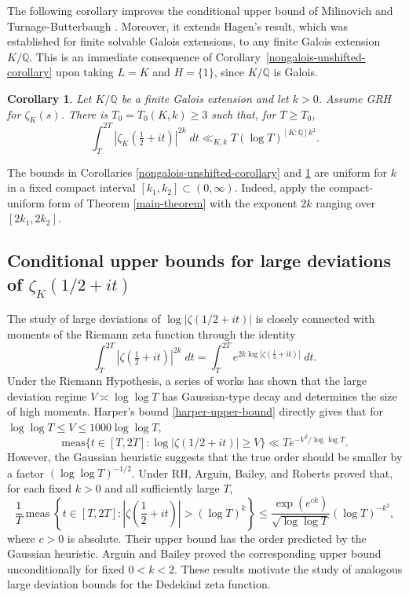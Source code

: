 \documentclass[twoside,reqno,11pt,a4paper]{amsart}
\numberwithin{equation}{section}
\theoremstyle{plain}
\newtheorem{cor}[thm]{Corollary}
\theoremstyle{definition}
\theoremstyle{remark}
\renewcommand{\le}{\leqslant}
\renewcommand{\leq}{\leqslant}
\renewcommand{\ge}{\geqslant}
\renewcommand{\geq}{\geqslant}
\begin{document}
The following corollary improves the conditional upper bound of Milinovich and Turnage-Butterbaugh \cite{M-T}. Moreover, it extends Hagen's \cite{Hagen} result, which was established for finite solvable Galois extensions, to any finite Galois extension $K/\mathbb{Q}$. This is an immediate consequence of Corollary~\ref{nongalois-unshifted-corollary} upon taking $L=K$ and $H=\{1\}$, since $K/\mathbb{Q}$ is Galois.

		\begin{cor}\label{sharp-bound-dedekind-zeta}
Let $K/\mathbb Q$ be a finite Galois extension and let $k>0$. Assume GRH for $\zeta_K(s)$. There is $T_0=T_0(K,k)\ge3$ such that, for $T\ge T_0$,
			\begin{equation*}
				\int_{T}^{2T}\left|\zeta_K\left(\tfrac{1}{2}+it\right) \right|^{2k}\;dt\ll_{K,k} T(\log T)^{[K:\mathbb{Q}]k^2}.
			\end{equation*}
		\end{cor}

The bounds in Corollaries \ref{nongalois-unshifted-corollary} and \ref{sharp-bound-dedekind-zeta} are uniform for $k$ in a fixed compact interval $[k_1,k_2]\subset(0,\infty)$. Indeed, apply the compact-uniform form of Theorem \ref{main-theorem} with the exponent $2k$ ranging over $[2k_1,2k_2]$.

\subsection{Conditional upper bounds for large deviations of $\zeta_K(1/2+it)$}
The study of large deviations of $\log |\zeta(1/2+it)|$ is closely connected with moments of the Riemann zeta function through the identity
\begin{equation*}
\int_T^{2T}|\zeta(\tfrac{1}{2}+it)|^{2k}\;dt=\int_T^{2T}e^{2k\log|\zeta(\tfrac{1}{2}+it)|}\;dt.
\end{equation*}
Under the Riemann Hypothesis, a series of works has shown that the large deviation regime $V\asymp \log\log T$ has Gaussian-type decay and determines the size of high moments. Harper's bound \eqref{harper-upper-bound} directly gives that for $\log\log T \leq V\leq 1000\log\log T$, 
	\begin{equation*}
		\text{meas}\{ t\in[T,2T]: \log|\zeta(1/2+it)|\geq V\}\ll Te^{-V^2/\log\log T}.
	\end{equation*}
	However, the Gaussian heuristic suggests that the true order should be smaller by a factor $(\log\log T)^{-1/2}$. Under RH, Arguin, Bailey, and Roberts \cite{Arguin-Bailey-Roberts} proved that, for each fixed $k>0$ and all sufficiently large $T$,
\begin{equation*}
\frac1T\operatorname{meas}\left\{t\in[T,2T]:
\left|\zeta\left(\frac12+it\right)\right|>(\log T)^k\right\}
\le \frac{\exp(e^{ck})}{\sqrt{\log\log T}}(\log T)^{-k^2},
\end{equation*}
where $c>0$ is absolute. Their upper bound has the order predicted by the Gaussian heuristic. Arguin and Bailey \cite{Arguin-Bailey} proved the corresponding upper bound unconditionally for fixed $0<k<2$. These results motivate the study of analogous large deviation bounds for the Dedekind zeta function.
	
\end{document}
